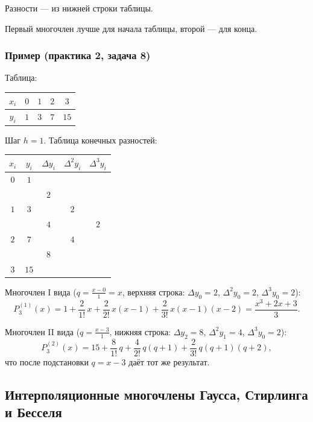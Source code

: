 Разности --- из нижней строки таблицы.

Первый многочлен лучше для начала таблицы, второй --- для конца.

\subsubsection*{Пример (практика 2, задача 8)}

Таблица:

\begin{center}
\begin{tabular}{c|cccc}
    $x_i$ & $0$ & $1$ & $2$ & $3$ \\
    \hline
    $y_i$ & $1$ & $3$ & $7$ & $15$
\end{tabular}
\end{center}

Шаг $h = 1$. Таблица конечных разностей:

\begin{center}
\begin{tabular}{c|c|c|c|c}
    $x_i$ & $y_i$ & $\Delta y_i$ & $\Delta^2 y_i$ & $\Delta^3 y_i$ \\
    \hline
    $0$ & $1$ & & & \\
        &     & $2$ & & \\
    $1$ & $3$ &    & $2$ & \\
        &     & $4$ &   & $2$ \\
    $2$ & $7$ &    & $4$ & \\
        &     & $8$ & & \\
    $3$ & $15$ & & &
\end{tabular}
\end{center}

Многочлен I вида ($q = \frac{x - 0}{1} = x$, верхняя строка: $\Delta y_0 = 2$, $\Delta^2 y_0 = 2$, $\Delta^3 y_0 = 2$):
\[
    P_3^{(1)}(x) = 1 + \frac{2}{1!}\,x + \frac{2}{2!}\,x(x-1) + \frac{2}{3!}\,x(x-1)(x-2) = \frac{x^3 + 2x + 3}{3}.
\]

Многочлен II вида ($q = \frac{x - 3}{1}$, нижняя строка: $\Delta y_2 = 8$, $\Delta^2 y_1 = 4$, $\Delta^3 y_0 = 2$):
\[
    P_3^{(2)}(x) = 15 + \frac{8}{1!}\,q + \frac{4}{2!}\,q(q+1) + \frac{2}{3!}\,q(q+1)(q+2),
\]
что после подстановки $q = x - 3$ даёт тот же результат.


\subsection{Интерполяционные многочлены Гаусса, Стирлинга и Бесселя}

